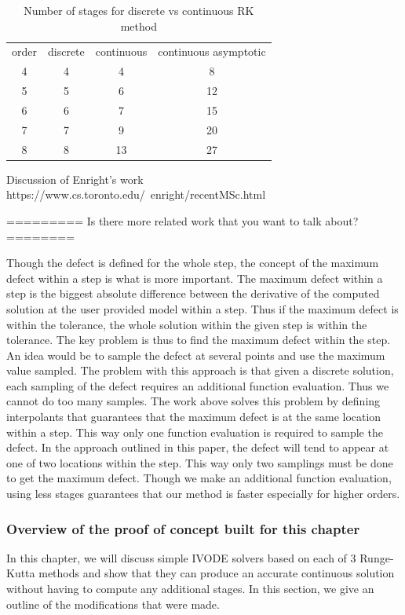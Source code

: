 \documentclass{article}
\begin{document}
\begin{table}[h]
\caption {Number of stages for discrete vs continuous RK method} 
\label{tab:crk_nstages}
\begin{center}
\begin{tabular}{ c c c c} 
order   & discrete & continuous & continuous asymptotic \\ 
4 & 4  & 4   & 8 \\ 
5 & 5  & 6   & 12 \\ 
6 & 6  & 7   & 15 \\ 
7 & 7  & 9   & 20 \\ 
8 & 8  & 13  & 27 \\ 
\end{tabular}
\end{center}
\end{table}

Discussion of Enright's work
https://www.cs.toronto.edu/~enright/recentMSc.html

=========
Is there more related work that you want to talk about?
========

Though the defect is defined for the whole step, the concept of the maximum defect within a step is what is more important. The maximum defect within a step is the biggest absolute difference between the derivative of the computed solution at the user provided model within a step. Thus if the maximum defect is within the tolerance, the whole solution within the given step is within the tolerance. The key problem is thus to find the maximum defect within the step. An idea would be to sample the defect at several points and use the maximum value sampled. The problem with this approach is that given a discrete solution, each sampling of the defect requires an additional function evaluation. Thus we cannot do too many samples. The work above solves this problem by defining interpolants that guarantees that the maximum defect is at the same location within a step. This way only one function evaluation is required to sample the defect. In the approach outlined in this paper, the defect will tend to appear at one of two locations within the step. This way only two samplings must be done to get the maximum defect. Though we make an additional function evaluation, using less stages guarantees that our method is faster especially for higher orders.


\subsubsection{Overview of the proof of concept built for this chapter}
\label{section:basic_runge_kutta}
In this chapter, we will discuss simple IVODE solvers based on each of 3 Runge-Kutta methods and show that they can produce an accurate continuous solution without having to compute any additional stages. In this section, we give an outline of the modifications that were made.
\end{document}
